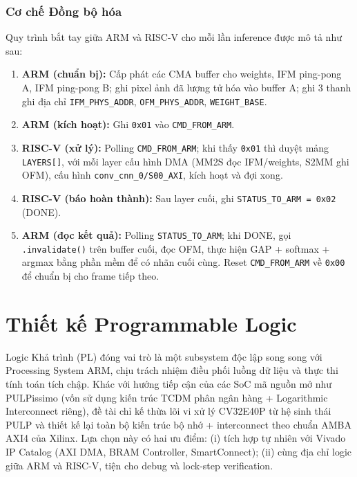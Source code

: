 \subsubsection{Cơ chế Đồng bộ hóa}
Quy trình bắt tay giữa ARM và RISC-V cho mỗi lần inference được mô tả như sau:
\begin{enumerate}
    \item \textbf{ARM (chuẩn bị):} Cấp phát các CMA buffer cho weights, IFM ping-pong A, IFM ping-pong B; ghi pixel ảnh đã lượng tử hóa vào buffer A; ghi 3 thanh ghi địa chỉ \texttt{IFM\_PHYS\_ADDR}, \texttt{OFM\_PHYS\_ADDR}, \texttt{WEIGHT\_BASE}.
    \item \textbf{ARM (kích hoạt):} Ghi \texttt{0x01} vào \texttt{CMD\_FROM\_ARM}.
    \item \textbf{RISC-V (xử lý):} Polling \texttt{CMD\_FROM\_ARM}; khi thấy \texttt{0x01} thì duyệt mảng \texttt{LAYERS[]}, với mỗi layer cấu hình DMA (MM2S đọc IFM/weights, S2MM ghi OFM), cấu hình \texttt{conv\_cnn\_0/S00\_AXI}, kích hoạt và đợi xong.
    \item \textbf{RISC-V (báo hoàn thành):} Sau layer cuối, ghi \texttt{STATUS\_TO\_ARM = 0x02} (DONE).
    \item \textbf{ARM (đọc kết quả):} Polling \texttt{STATUS\_TO\_ARM}; khi DONE, gọi \texttt{.invalidate()} trên buffer cuối, đọc OFM, thực hiện GAP + softmax + argmax bằng phần mềm để có nhãn cuối cùng. Reset \texttt{CMD\_FROM\_ARM} về \texttt{0x00} để chuẩn bị cho frame tiếp theo.
\end{enumerate}


%
\newpage
\section{Thiết kế Programmable Logic}
\label{sec:pl_design}

Logic Khả trình (PL) đóng vai trò là một subsystem độc lập song song với Processing System ARM, chịu trách nhiệm điều phối luồng dữ liệu và thực thi tính toán tích chập. Khác với hướng tiếp cận của các SoC mã nguồn mở như PULPissimo (vốn sử dụng kiến trúc TCDM phân ngân hàng + Logarithmic Interconnect riêng), đề tài chỉ kế thừa lõi vi xử lý CV32E40P từ hệ sinh thái PULP và thiết kế lại toàn bộ kiến trúc bộ nhớ + interconnect theo chuẩn AMBA AXI4 của Xilinx. Lựa chọn này có hai ưu điểm: (i) tích hợp tự nhiên với Vivado IP Catalog (AXI DMA, BRAM Controller, SmartConnect); (ii) cùng địa chỉ logic giữa ARM và RISC-V, tiện cho debug và lock-step verification.

